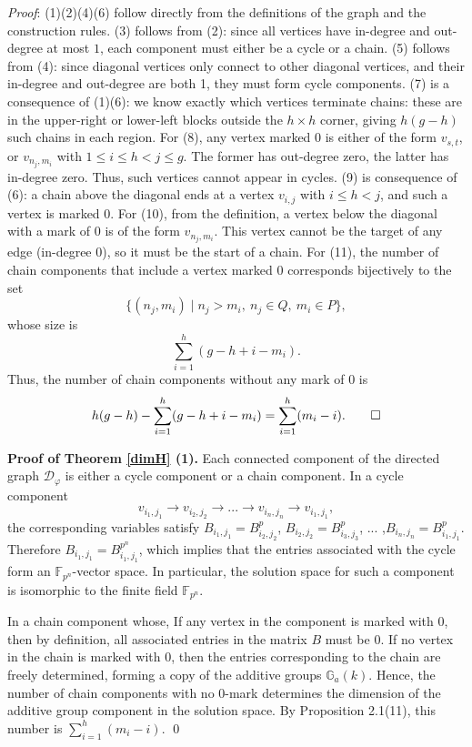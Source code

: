 \documentclass[a4paper,12pt,twoside]{report}
\newcommand{\F}{\mathbb{F}}
\newcommand{\G}{\mathbb{G}}
\begin{document}
\noindent\emph{Proof}: (1)(2)(4)(6) follow directly from the definitions of the graph and the construction rules. 
(3) follows from (2): since all vertices have in-degree and out-degree at most $1$, 
each component must either be a cycle or a chain. (5) follows from (4): since diagonal vertices only connect to other diagonal vertices, 
and their in-degree and out-degree are both 1, they must form cycle components. 
(7) is a consequence of (1)(6): we know exactly which vertices terminate chains: 
these are in the upper-right or lower-left blocks outside the \( h \times h \) corner, giving \( h(g - h) \) such chains in each region. 
For (8), any vertex marked $0$ is either of the form \( v_{s,t} \), or \( v_{n_j,m_i} \) with \( 1 \leq i \leq h < j \leq g \). 
The former has out-degree zero, the latter has in-degree zero. Thus, such vertices cannot appear in cycles. 
(9) is consequence of (6): a chain above the diagonal ends at a vertex \( v_{i,j} \) with \( i \leq h < j \), and such a vertex is marked $0$. 
For (10),  from the definition, a vertex below the diagonal with a mark of $0$ 
is of the form \( v_{n_j, m_i} \). This vertex cannot be the target of any edge (in-degree $0$), so it must be the start of a chain.
For (11), the number of chain components that include a vertex marked $0$ corresponds bijectively to the set
\[
\{ (n_j, m_i) \mid n_j > m_i, \ n_j \in Q, \ m_i \in P \},
\]
whose size is
\[
\sum_{i=1}^h (g - h + i - m_i).
\]
Thus, the number of chain components without any mark of 0 is
\[
h(g - h) - \sum_{i=1}^h (g - h + i - m_i) = \sum_{i=1}^h (m_i - i). \qed
\]


\noindent\textbf{Proof of Theorem \ref{dimH} (1).}
Each connected component of the directed graph
$\mathcal{D}_{\varphi}$  is either a cycle component or a chain component. 
In a cycle component
\[v_{i_1,j_1}\rightarrow v_{i_2,j_2}\rightarrow... \rightarrow v_{i_n,j_n}\rightarrow v_{i_1,j_1},\] 
the corresponding variables satisfy $B_{i_1,j_1}=B_{i_2,j_2}^p$, $B_{i_2,j_2}=B_{i_3,j_3}^p$, ... ,$B_{i_n,j_n}=B_{i_1,j_1}^p$. 
Therefore $B_{i_1,j_1}=B_{i_1,j_1}^{p^n}$, 
which implies that the entries associated with the cycle form an $\F_{p^n}$-vector space. 
In particular, the solution space for such a component is isomorphic to the finite field $\F_{p^n}$.

In a chain component whose, If any vertex in the component is marked with $0$, 
then by definition, all associated entries in the matrix $B$ must be $0$. 
If no vertex in the chain is marked with $0$, 
then the entries corresponding to the chain are freely determined, 
forming a copy of the additive groups $\G_a(k)$. 
Hence, the number of chain components with no $0$-mark determines the dimension of the 
additive group component in the solution space. 
By Proposition 2.1(11), this number is $\sum_{i=1}^h (m_i - i).$ \qed
\end{document}
